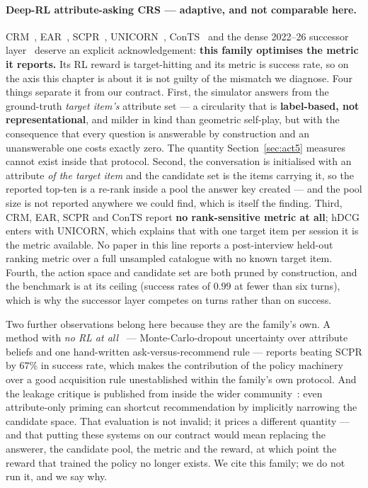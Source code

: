 \documentclass[11pt]{article}
\begin{document}
\paragraph{Deep-RL attribute-asking CRS --- adaptive, and not comparable here.} CRM~\cite{sun2018conversational},
EAR~\cite{lei2020estimation}, SCPR~\cite{lei2020interactive}, UNICORN~\cite{deng2021unicorn},
ConTS~\cite{li2021seamlessly} and the dense 2022--26 successor
layer~\cite{qian2023hutcrs,zheng2025hypercrs} deserve an explicit acknowledgement: \textbf{this
family optimises the metric it reports.} Its RL reward is target-hitting and its metric is success
rate, so on the axis this chapter is about it is not guilty of the mismatch we diagnose. Four things
separate it from our contract. First, the simulator answers from the ground-truth \emph{target
item's} attribute set --- a circularity that is \textbf{label-based, not representational}, and
milder in kind than geometric self-play, but with the consequence that every question is answerable
by construction and an unanswerable one costs exactly zero. The quantity Section~\ref{sec:act5} measures cannot exist
inside that protocol. Second, the conversation is initialised with an attribute \emph{of the target
item} and the candidate set is the items carrying it, so the reported top-ten is a re-rank inside a
pool the answer key created --- and the pool size is not reported anywhere we could find, which is
itself the finding. Third, CRM, EAR, SCPR and ConTS report \textbf{no rank-sensitive metric at all};
hDCG enters with UNICORN, which explains that with one target item per session it is the metric
available. No paper in this line reports a post-interview held-out ranking metric over a full
unsampled catalogue with no known target item. Fourth, the action space and candidate set are both
pruned by construction, and the benchmark is at its ceiling (success rates of $0.99$ at fewer than
six turns), which is why the successor layer competes on turns rather than on success.

Two further observations belong here because they are the family's own. A method with \emph{no RL at
all}~\cite{zhang2022minicorn} --- Monte-Carlo-dropout uncertainty over attribute beliefs and one
hand-written ask-versus-recommend rule --- reports beating SCPR by $67\%$ in success rate, which
makes the contribution of the policy machinery over a good acquisition rule unestablished within the
family's own protocol. And the leakage critique is published from inside the wider
community~\cite{kim2024targetfree}: even attribute-only priming can shortcut recommendation by
implicitly narrowing the candidate space. That evaluation is not invalid; it prices a different
quantity --- and that putting these systems on our contract would mean
replacing the answerer, the candidate pool, the metric and the reward, at which point the reward that
trained the policy no longer exists. We cite this family; we do not run it, and we say why.
\end{document}

